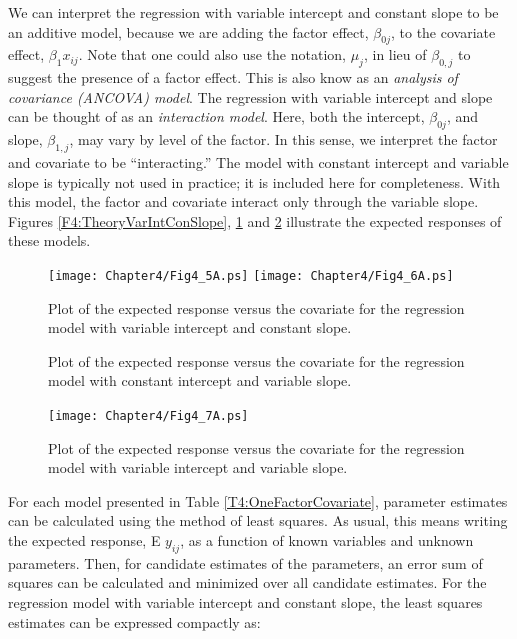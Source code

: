 We can interpret the regression with variable intercept and constant
slope to be an additive model, because we are adding the factor
effect, $\beta_{0j}$, to the covariate effect, $\beta_1x_{ij}$. Note
that one could also use the notation, $\mu_{j}$, in lieu of $\beta
_{0,j}$ to suggest the presence of a factor effect. This is also
know as an \emph{analysis of covariance (ANCOVA) model}. The
regression with variable intercept and slope can be thought of as an
\emph{interaction model}. Here, both the intercept, $\beta_{0j}$,
and slope, $\beta_{1,j}$, may vary by level of the factor. In this
sense, we interpret the factor and covariate to be ``interacting.''
The model with constant intercept and variable slope is typically
not used in practice; it is included here for completeness. With
this model, the factor and covariate interact only through the
variable slope. Figures \ref{F4:TheoryVarIntConSlope},
\ref{F4:TheoryConIntVarSlope} and \ref{F4:TheoryVarIntVarSlope}
illustrate the expected responses of these models.



\begin{figure}[htp]
  \begin{center}
    \texttt{[image: Chapter4/Fig4\_5A.ps]}
    \texttt{[image: Chapter4/Fig4\_6A.ps]} \hfill
     \parbox[t]{2.5in}{\caption{\label{F4:TheoryVarIntConSlope} \small  Plot of the expected response versus the covariate for the regression model
with variable intercept and constant slope.}} \hfill
    \parbox[t]{2.5in}{\caption{\label{F4:TheoryConIntVarSlope} \small  Plot of the expected response versus the covariate for the regression model
with constant intercept and variable slope.}}
  \end{center}
\end{figure}


\begin{figure}[htp]
  \begin{center}
    \texttt{[image: Chapter4/Fig4\_7A.ps]}
    \caption{\label{F4:TheoryVarIntVarSlope} \small  Plot of the expected response versus the covariate for the regression model
with variable intercept and variable slope.}
  \end{center}
\end{figure}

For each model presented in Table \ref{T4:OneFactorCovariate},
parameter estimates can be calculated using the method of least
squares. As usual, this means writing the expected response, E
$y_{ij}$, as a function of known variables and unknown parameters.
Then, for candidate estimates of the parameters, an error sum of
squares can be calculated and minimized over all candidate
estimates. For the regression model with variable intercept and
constant slope, the least squares estimates can be expressed
compactly as:

